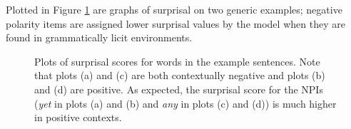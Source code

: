 \documentclass[11pt, round]{article}
\begin{document}
Plotted in Figure \ref{fig:surprisal-basic-licensing} are graphs of surprisal on two generic examples; negative polarity items are assigned lower surprisal values by the model when they are found in grammatically licit environments. 

\begin{figure}
    \centering
    \qquad
    \caption{Plots of surprisal scores for words in the example sentences. Note that plots (a) and (c) are both contextually negative and plots (b) and (d) are positive. As expected, the surprisal score for the NPIs (\textit{yet} in plots (a) and (b) and \textit{any} in plots (c) and (d)) is much higher in positive contexts.}
    \label{fig:surprisal-basic-licensing}
\end{figure}
\end{document}
